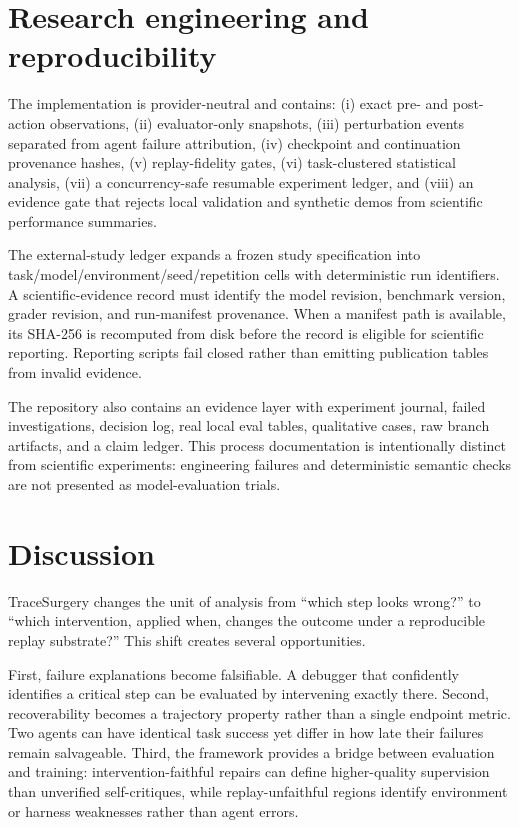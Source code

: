 \documentclass{article}
\begin{document}
\section{Research engineering and reproducibility}

The implementation is provider-neutral and contains: (i) exact pre- and post-action observations, (ii) evaluator-only snapshots, (iii) perturbation events separated from agent failure attribution, (iv) checkpoint and continuation provenance hashes, (v) replay-fidelity gates, (vi) task-clustered statistical analysis, (vii) a concurrency-safe resumable experiment ledger, and (viii) an evidence gate that rejects local validation and synthetic demos from scientific performance summaries.

The external-study ledger expands a frozen study specification into task/model/environment/seed/repetition cells with deterministic run identifiers. A scientific-evidence record must identify the model revision, benchmark version, grader revision, and run-manifest provenance. When a manifest path is available, its SHA-256 is recomputed from disk before the record is eligible for scientific reporting. Reporting scripts fail closed rather than emitting publication tables from invalid evidence.

The repository also contains an evidence layer with experiment journal, failed investigations, decision log, real local eval tables, qualitative cases, raw branch artifacts, and a claim ledger. This process documentation is intentionally distinct from scientific experiments: engineering failures and deterministic semantic checks are not presented as model-evaluation trials.

\section{Discussion}

TraceSurgery changes the unit of analysis from ``which step looks wrong?'' to ``which intervention, applied when, changes the outcome under a reproducible replay substrate?'' This shift creates several opportunities.

First, failure explanations become falsifiable. A debugger that confidently identifies a critical step can be evaluated by intervening exactly there. Second, recoverability becomes a trajectory property rather than a single endpoint metric. Two agents can have identical task success yet differ in how late their failures remain salvageable. Third, the framework provides a bridge between evaluation and training: intervention-faithful repairs can define higher-quality supervision than unverified self-critiques, while replay-unfaithful regions identify environment or harness weaknesses rather than agent errors.
\end{document}
